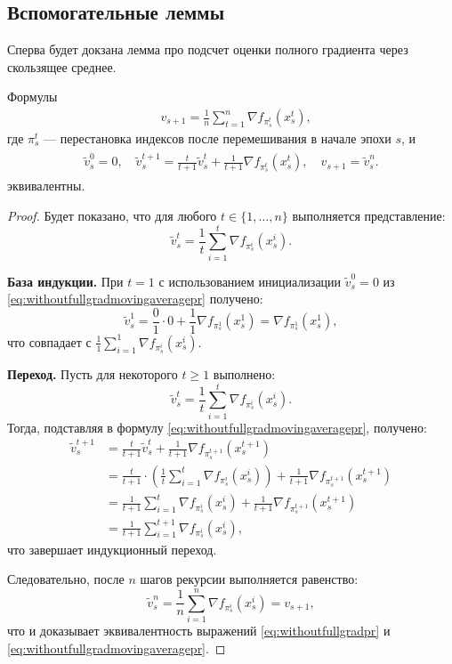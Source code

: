 \subsection{Вспомогательные леммы}
Сперва будет докзана лемма про подсчет оценки полного градиента через скользящее среднее. 
\begin{lemma}\label{lemma:movingaverageproof}
Формулы
\begin{align} \label{eq:withoutfullgradpr}
    &\textstyle{v_{s+1} = \frac{1}{n} \sum\limits_{t=1}^n \nabla f_{\pi_s^t}(x_s^t),}
\end{align}
где \(\pi_s^t\) — перестановка индексов после перемешивания в начале эпохи \(s\), и
\begin{align}
\label{eq:withoutfullgradmovingaveragepr}
\begin{split}
    \textstyle{\widetilde{v}_s^{0}} = 0, \quad \textstyle{\widetilde{v}_s^{t+1}} = \textstyle{\frac{t}{t+1} \widetilde{v}_s^{t} + \frac{1}{t+1} \nabla f_{\pi_s^t}(x_s^t), \quad v_{s+1} = \widetilde{v}_s^n.}
\end{split}
\end{align} 
эквивалентны.
\end{lemma}
\begin{proof}
Будет показано, что для любого \(t \in \{1, \dots, n\}\) выполняется представление:
\[
\widetilde{v}_s^{t} = \frac{1}{t} \sum_{i=1}^{t} \nabla f_{\pi_s^i}(x_s^i).
\]

\textbf{База индукции.} При \(t = 1\) с использованием инициализации \(\widetilde{v}_s^0 = 0\) из \eqref{eq:withoutfullgradmovingaveragepr} получено:
\[
\widetilde{v}_s^1 = \frac{0}{1} \cdot 0 + \frac{1}{1} \nabla f_{\pi_s^1}(x_s^1) = \nabla f_{\pi_s^1}(x_s^1),
\]
что совпадает с \(\frac{1}{1} \sum_{i=1}^{1} \nabla f_{\pi_s^i}(x_s^i)\).

\textbf{Переход.} Пусть для некоторого \(t \geq 1\) выполнено:
\[
\widetilde{v}_s^t = \frac{1}{t} \sum_{i=1}^{t} \nabla f_{\pi_s^i}(x_s^i).
\]
Тогда, подставляя в формулу \eqref{eq:withoutfullgradmovingaveragepr}, получено:
\begin{align*}
\widetilde{v}_s^{t+1} &= \frac{t}{t+1} \widetilde{v}_s^t + \frac{1}{t+1} \nabla f_{\pi_s^{t+1}}(x_s^{t+1}) \\
&= \frac{t}{t+1} \cdot \left( \frac{1}{t} \sum_{i=1}^{t} \nabla f_{\pi_s^i}(x_s^i) \right) + \frac{1}{t+1} \nabla f_{\pi_s^{t+1}}(x_s^{t+1}) \\
&= \frac{1}{t+1} \sum_{i=1}^{t} \nabla f_{\pi_s^i}(x_s^i) + \frac{1}{t+1} \nabla f_{\pi_s^{t+1}}(x_s^{t+1}) \\
&= \frac{1}{t+1} \sum_{i=1}^{t+1} \nabla f_{\pi_s^i}(x_s^i),
\end{align*}
что завершает индукционный переход.

Следовательно, после \(n\) шагов рекурсии выполняется равенство:
\[
\widetilde{v}_s^n = \frac{1}{n} \sum_{i=1}^{n} \nabla f_{\pi_s^i}(x_s^i) = v_{s+1},
\]
что и доказывает эквивалентность выражений \eqref{eq:withoutfullgradpr} и \eqref{eq:withoutfullgradmovingaveragepr}.
\end{proof}
